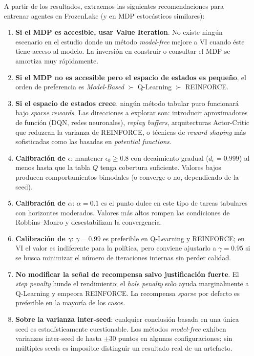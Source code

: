 \documentclass[11pt,a4paper]{article}
\begin{document}
A partir de los resultados, extraemos las siguientes recomendaciones para entrenar agentes en FrozenLake (y en MDP estocásticos similares):
\begin{enumerate}
  \item \textbf{Si el MDP es accesible, usar Value Iteration}. No existe ningún escenario en el estudio donde un método \emph{model-free} mejore a VI cuando éste tiene acceso al modelo. La inversión en construir o consultar el MDP se amortiza muy rápidamente.
  \item \textbf{Si el MDP no es accesible pero el espacio de estados es pequeño}, el orden de preferencia es \emph{Model-Based} $\succ$ Q-Learning $\succ$ REINFORCE.
  \item \textbf{Si el espacio de estados crece}, ningún método tabular puro funcionará bajo \emph{sparse rewards}. Las direcciones a explorar son: introducir aproximadores de función (DQN, redes neuronales), \emph{replay buffers}, arquitecturas Actor-Critic que reduzcan la varianza de REINFORCE, o técnicas de \emph{reward shaping} más sofisticadas como las basadas en \emph{potential functions}.
  \item \textbf{Calibración de $\epsilon$}: mantener $\epsilon_0 \geq 0.8$ con decaimiento gradual ($d_\epsilon = 0.999$) al menos hasta que la tabla $Q$ tenga cobertura suficiente. Valores bajos producen comportamientos bimodales (o converge o no, dependiendo de la seed).
  \item \textbf{Calibración de $\alpha$}: $\alpha=0.1$ es el punto dulce en este tipo de tareas tabulares con horizontes moderados. Valores más altos rompen las condiciones de Robbins--Monro y desestabilizan la convergencia.
  \item \textbf{Calibración de $\gamma$}: $\gamma=0.99$ es preferible en Q-Learning y REINFORCE; en VI el valor es indiferente para la política, pero conviene ajustarlo a $\gamma=0.95$ si se busca minimizar el número de iteraciones internas sin perder calidad.
  \item \textbf{No modificar la señal de recompensa salvo justificación fuerte}. El \emph{step penalty} hunde el rendimiento; el \emph{hole penalty} solo ayuda marginalmente a Q-Learning y empeora REINFORCE. La recompensa \emph{sparse} por defecto es preferible en la mayoría de los casos.
  \item \textbf{Sobre la varianza inter-seed}: cualquier conclusión basada en una única seed es estadísticamente cuestionable. Los métodos \emph{model-free} exhiben varianzas inter-seed de hasta $\pm 30$ puntos en algunas configuraciones; sin múltiples seeds es imposible distinguir un resultado real de un artefacto.
\end{enumerate}
\end{document}
